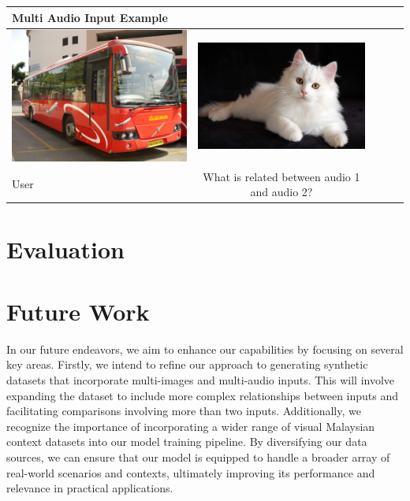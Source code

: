\documentclass[preprint]{article}
\begin{document}
\begin{table}[hbt!]
  \setlength{\extrarowheight}{3pt} %
  \renewcommand{\arraystretch}{1.5} %
  \begin{tabular}{lcccl}
    \hline
    \textbf{Multi Audio Input Example}                                                                                                                     \\[6pt]  %
    \hline
    \hline
    \includegraphics[width=0.45\linewidth,keepaspectratio]{pic/R.jpeg} & \includegraphics[width=0.45\linewidth,keepaspectratio]{pic/Persian-cat-breed.jpg} \\
    User                                                               & What is related between audio 1 and audio 2?                                      \\
    \hline
  \end{tabular}
\end{table}


\section{Evaluation}

\section{Future Work}

In our future endeavors, we aim to enhance our capabilities by focusing on several key areas. Firstly, we intend to refine our approach to generating synthetic datasets that incorporate multi-images and multi-audio inputs. This will involve expanding the dataset to include more complex relationships between inputs and facilitating comparisons involving more than two inputs. Additionally, we recognize the importance of incorporating a wider range of visual Malaysian context datasets into our model training pipeline. By diversifying our data sources, we can ensure that our model is equipped to handle a broader array of real-world scenarios and contexts, ultimately improving its performance and relevance in practical applications.
\end{document}
